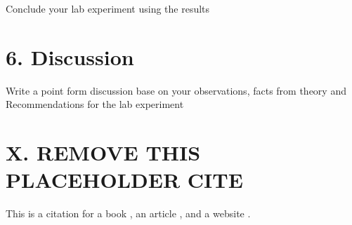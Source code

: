 \documentclass[a4paper,12pt]{article}
\begin{document}
Conclude your lab experiment using the results


\section*{6. Discussion}

Write a point form discussion base on your observations, facts from theory and Recommendations for the lab experiment


\section*{X. REMOVE THIS PLACEHOLDER CITE}
This is a citation for a book \parencite{Doe2020}, an article \parencite{Smith2021}, and a website \parencite{Website2022}.

\newpage
\vspace*{12pt}
\printbibliography[title={References}]
\end{document}
